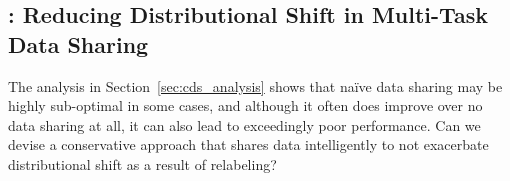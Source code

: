

\vspace{-0.2cm}
\subsection{\cdsmethodname: Reducing Distributional Shift in Multi-Task Data Sharing}
\label{sec:cds_method}
\vspace{-0.2cm}
The analysis in Section~\ref{sec:cds_analysis} shows that na\"ive data sharing may be highly sub-optimal in some cases, and although it often does improve over no data sharing at all, it can also lead to exceedingly poor performance. Can we devise a conservative approach that shares data intelligently to not exacerbate distributional shift as a result of relabeling?

